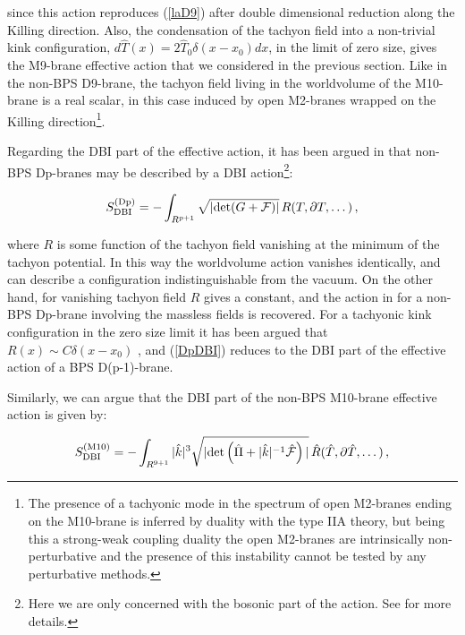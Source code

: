 \documentclass[12pt,a4paper]{article}
\begin{document}
\noindent since this action reproduces (\ref{laD9}) after double
dimensional reduction along the Killing direction. 
Also, the condensation of the tachyon field
into a non-trivial kink configuration, 
$d{\hat T}(x)=2{\hat T}_0 \delta (x-x_0) dx$, in the limit of zero
size, gives the M9-brane effective action that we
considered in the previous section. 
Like in the non-BPS D9-brane, the tachyon field living in the worldvolume
of the M10-brane is a real scalar, in this case induced by open M2-branes wrapped
on the Killing direction\footnote{The presence
of a tachyonic mode in the spectrum of open M2-branes
ending on the M10-brane is inferred by duality with the type IIA
theory, but being this a strong-weak coupling duality the open M2-branes
are intrinsically non-perturbative and the presence of this
instability cannot be tested by any perturbative methods.}.

Regarding the DBI part of the effective action, it has been argued in
\cite{Sen2} that non-BPS Dp-branes may be described by a DBI 
action\footnote{Here we are only concerned with the bosonic part of
the action. See \cite{Sen2} for more details.}:

\begin{equation}
\label{DpDBI}
S^{({\rm Dp})}_{{\rm DBI}}=-\int_{R^{p+1}} \sqrt{|{\rm det}(G+{\cal F})|}
\,R(T,\partial T,\dots)\, ,
\end{equation}

\noindent where $R$ is some function of the tachyon field vanishing
at the minimum of the tachyon potential. In this way
the worldvolume action vanishes
identically, and can describe a configuration indistinguishable from
the vacuum. On the other hand, for vanishing tachyon field $R$ gives
a constant, and the action in \cite{Sen2} for a non-BPS Dp-brane 
involving the massless fields is recovered. 
For a tachyonic kink configuration in the zero size limit
it has been argued that
$R(x)\sim C \delta(x-x_0)$ \cite{Kluson}, and (\ref{DpDBI})
reduces to the DBI part of the effective action of a BPS 
D(p-1)-brane.

Similarly, we can argue that the DBI part of the non-BPS
M10-brane effective action is given by: 

\begin{equation}
\label{M10DBI}
S^{({\rm M10})}_{{\rm DBI}} =-\int_{R^{9+1}} |{\hat k}|^3 
\sqrt{|{\rm det} \left( {\hat \Pi}+ |{\hat k}|^{-1}  
{\hat {\cal F}} \right)|}
\,{\hat R}({\hat T},\partial {\hat T},\dots)\, ,
\end{equation}
\end{document}

